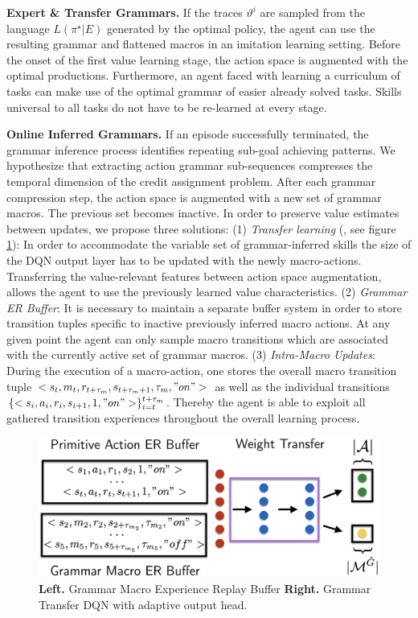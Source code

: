 \documentclass[10pt,letterpaper]{article}
\begin{document}
\textbf{Expert \& Transfer Grammars.} If the traces $\vartheta^i$ are sampled from the language $L(\pi^\star|E)$ generated by the optimal policy, the agent can use the resulting grammar and flattened macros in an imitation learning setting. Before the onset of the first value learning stage, the action space is augmented with the optimal productions. Furthermore, an agent faced with learning a curriculum of tasks can make use of the optimal grammar of easier already solved tasks. Skills universal to all tasks do not have to be re-learned at every stage. 

\textbf{Online Inferred Grammars.} If an episode successfully terminated, the grammar inference process identifies repeating sub-goal achieving patterns. We hypothesize that extracting action grammar sub-sequences compresses the temporal dimension of the credit assignment problem. After each grammar compression step, the action space is augmented with a new set of grammar macros. The previous set becomes inactive. 
In order to preserve value estimates between updates, we propose three solutions:
(1) \textit{Transfer learning} (, see figure \ref{fig:online_ag_dqn}): In order to accommodate the variable set of grammar-inferred skills the size of the DQN output layer has to be updated with the newly macro-actions. Transferring the value-relevant features between action space augmentation, allows the agent to use the previously learned value characteristics.
(2) \textit{Grammar ER Buffer}: It is necessary to maintain a separate buffer system in order to store transition tuples specific to inactive previously inferred macro actions. At any given point the agent can only sample macro transitions which are associated with the currently active set of grammar macros.
(3) \textit{Intra-Macro Updates}: During the execution of a macro-action, one stores the overall macro transition tuple $<s_t,m_t,r_{t +\tau_m}, s_{t +\tau_m +1}, \tau_m, "on">$ as well as the individual transitions $\{<s_i,a_i,r_i, s_{i+1}, 1, "on">\}_{i=t}^{t + \tau_m}$. Thereby the agent is able to exploit all gathered transition experiences throughout the overall learning process.

\begin{figure}[H]
    \includegraphics[width=\linewidth]{figures/ag_dqn_buffer}
    \caption{\textbf{Left.} Grammar Macro Experience Replay Buffer \textbf{Right.} Grammar Transfer DQN with adaptive output head.}
  \label{fig:online_ag_dqn}
\end{figure}
    
\end{document}
